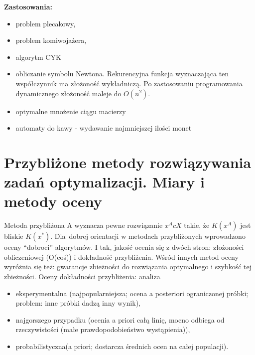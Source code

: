 \documentclass[10pt, a
4paper]{article}
\begin{document}
\noindent \textbf{Zastosowania:}
\begin{itemize}
\item problem plecakowy,
\item problem komiwojażera,
\item algorytm CYK
\item obliczanie symbolu Newtona. Rekurencyjna funkcja wyznaczająca ten współczynnik ma złożoność wykładniczą. Po zastosowaniu programowania dynamicznego złożoność maleje do $O(n^2)$.
\item optymalne mnożenie ciągu macierzy
\item automaty do kawy - wydawanie najmniejszej ilości monet
\end{itemize}





\newpage
\section{Przybliżone metody rozwiązywania zadań optymalizacji. Miary i metody oceny}
	Metoda przybliżona A wyznacza pewne rozwiązanie $x^A c X$ takie, że $K(x^A)$ jest bliskie $K(x^*)$. Dla~dobrej orientacji w metodach przybliżonych wprowadzono oceny “dobroci” algorytmów. I tak, jakość ocenia się z dwóch stron: złożoności obliczeniowej (O(coś)) i dokładność przybliżenia.  Wśród innych metod oceny wyróżnia się też: gwarancje zbieżności do rozwiązania optymalnego i szybkość tej zbieżności.
Oceny dokładności przybliżenia: analiza
\begin{itemize}
	\item eksperymentalna (najpopularniejsza; ocena a posteriori ograniczonej próbki; problem: inne próbki dadzą inny wynik),
    \item najgorszego przypadku (ocenia a priori całą linię, mocno odbiega od rzeczywistości (małe prawdopodobieństwo wystąpienia)),
    \item probabilistyczna(a priori; dostarcza średnich ocen na całej populacji).
\end{itemize}
\end{document}
